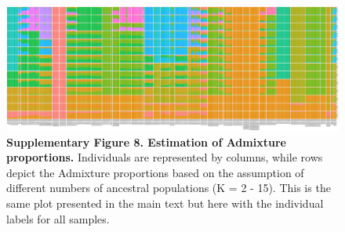 \documentclass[twoside, british, a4paper]{article}
\begin{document}
\begin{landscape}
\thispagestyle{mylandscape}
\begin{figure}
\centering
\includegraphics[width=1.5\textwidth]{../FPG--Pipeline/FPG--Plots/FPG--ngsAdmix/FPG--ngsAdmix_Labels-RColours.pdf}
\captionsetup{labelformat=empty}
\caption[\textbf{Supplementary Figure 8. Estimation of Admixture proportions.}]{\textbf{Supplementary Figure 8. Estimation of Admixture proportions.} Individuals are represented by columns, while rows depict the Admixture proportions based on the assumption of different numbers of ancestral populations (K = 2 - 15). This is the same plot presented in the main text but here with the individual labels for all samples.}
\label{MainText:FPG--ngsAdmix_Labels}
\end{figure}
\end{landscape}
\end{document}
